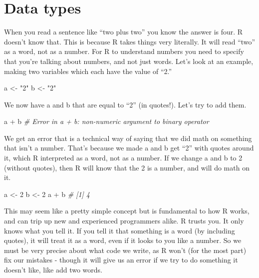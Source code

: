 \documentclass[
]{krantz}
\makeatletter
\newenvironment{Shaded}{\begin{snugshade}}{\end{snugshade}}
\newcommand{\CommentTok}[1]{\textcolor[rgb]{0.37,0.37,0.37}{\textit{#1}}}
\newcommand{\DecValTok}[1]{\textcolor[rgb]{0.06,0.06,0.06}{#1}}
\newcommand{\NormalTok}[1]{#1}
\newcommand{\OtherTok}[1]{\textcolor[rgb]{0.37,0.37,0.37}{#1}}
\newcommand{\SpecialCharTok}[1]{\textcolor[rgb]{0,0,0}{#1}}
\newcommand{\StringTok}[1]{\textcolor[rgb]{0.5,0.5,0.5}{#1}}
\newenvironment{kframe}{%
\medskip{}
\setlength{\fboxsep}{.8em}
 \def\at@end@of@kframe{}%
 \ifinner\ifhmode%
  \def\at@end@of@kframe{\end{minipage}}%
  \begin{minipage}{\columnwidth}%
 \fi\fi%
 \def\FrameCommand##1{\hskip\@totalleftmargin \hskip-\fboxsep
 \colorbox{shadecolor}{##1}\hskip-\fboxsep
     \hskip-\linewidth \hskip-\@totalleftmargin \hskip\columnwidth}%
 \MakeFramed {\advance\hsize-\width
   \@totalleftmargin\z@ \linewidth\hsize
   \@setminipage}}%
 {\par\unskip\endMakeFramed%
 \at@end@of@kframe}
\renewenvironment{Shaded}{\begin{kframe}}{\end{kframe}}
\makeatother
\begin{document}
\hypertarget{section-data-types}{%
\section{Data types}\label{section-data-types}}

When you read a sentence like ``two plus two'' you know the
answer is four. R doesn't know that. This is because R takes
things very literally. It will read ``two'' as a word, not
as a number. For R to understand numbers you need to specify
that you're talking about numbers, and not just words. Let's
look at an example, making two variables which each have the
value of ``2.''

\begin{Shaded}
\begin{Highlighting}[]
\NormalTok{a }\OtherTok{\textless{}{-}} \StringTok{"2"}
\NormalTok{b }\OtherTok{\textless{}{-}} \StringTok{"2"}
\end{Highlighting}
\end{Shaded}

We now have a and b that are equal to ``2'' (in quotes!).
Let's try to add them.

\begin{Shaded}
\begin{Highlighting}[]
\NormalTok{a }\SpecialCharTok{+}\NormalTok{ b}
\CommentTok{\# Error in a + b: non{-}numeric argument to binary operator}
\end{Highlighting}
\end{Shaded}

We get an error that is a technical way of saying that we
did math on something that isn't a number. That's because we
made a and b get ``2'' with quotes around it, which R
interpreted as a word, not as a number. If we change a and b
to 2 (without quotes), then R will know that the 2 is a
number, and will do math on it.

\begin{Shaded}
\begin{Highlighting}[]
\NormalTok{a }\OtherTok{\textless{}{-}} \DecValTok{2}
\NormalTok{b }\OtherTok{\textless{}{-}} \DecValTok{2}
\NormalTok{a }\SpecialCharTok{+}\NormalTok{ b}
\CommentTok{\# [1] 4}
\end{Highlighting}
\end{Shaded}

This may seem like a pretty simple concept but is
fundamental to how R works, and can trip up new and
experienced programmers alike. R trusts you. It only knows
what you tell it. If you tell it that something is a word
(by including quotes), it will treat it as a word, even if
it looks to you like a number. So we must be very precise
about what code we write, as R won't (for the most part) fix
our mistakes - though it will give us an error if we try to
do something it doesn't like, like add two words.
\end{document}
